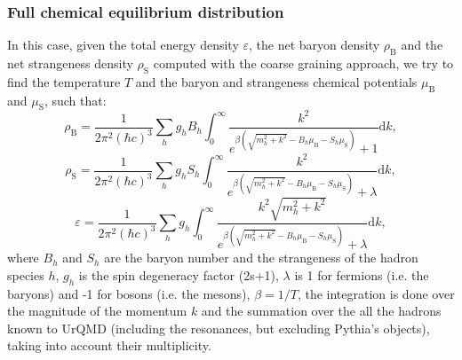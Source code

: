 \documentclass[12pt, a4paper]{article}
\newcommand{\dd}{\mathrm{d}}
\begin{document}
\subsubsection{Full chemical equilibrium distribution}\label{sec:fce}
In this case, given the total energy density $\varepsilon$, the net baryon density $\rho_{\mathrm{B}}$ and the net strangeness density $\rho_{\mathrm{S}}$ computed with the coarse graining approach, we try to find the temperature $T$ and the baryon and strangeness chemical potentials $\mu_{\mathrm{B}}$ and  $\mu_{\mathrm{S}}$, such that:
\begin{equation}
\rho_{\mathrm{B}}=\dfrac{1}{2\pi^2 (\hbar c)^3}\sum_{h}g_{h} B_{h} \int_0^\infty \dfrac{k^2}{e^{\beta{(\sqrt{m_{h}^2+k^2}-B_{h}\mu_{\mathrm{B}}-S_{h}\mu_{\mathrm{S}})}}+1}
\dd k, \label{eq:fce_rhoB}
\end{equation}
\begin{equation}
\rho_{\mathrm{S}}=\dfrac{1}{2\pi^2 (\hbar c)^3}\sum_{h}g_{h} S_{h} \int_0^\infty \dfrac{k^2}{e^{\beta{(\sqrt{m_{h}^2+k^2}-B_{h}\mu_{\mathrm{B}}-S_{h}\mu_{\mathrm{S}})}}+\lambda}
\dd k, \label{eq:fce_rhoS}
\end{equation}
\begin{equation}
\varepsilon=\dfrac{1}{2\pi^2 (\hbar c)^3}\sum_{h}g_{h}\int_0^\infty \dfrac{k^2\sqrt{m_{h}^2+k^2}}{e^{\beta{(\sqrt{m_{h}^2+k^2}-B_{h}\mu_{\mathrm{B}}-S_{h}\mu_{\mathrm{S}})}}+\lambda}
\dd k, \label{eq:fce_en}
\end{equation}
where $B_{h}$ and $S_{h}$ are the baryon number and the strangeness of the hadron species ${h}$, $g_{h}$ is the spin degeneracy factor (2s+1), $\lambda$ is 1 for fermions (i.e. the baryons) and -1 for bosons (i.e. the mesons), $\beta=1/T$, the integration is done over the magnitude of the momentum $k$ and the summation over the all the hadrons known to UrQMD (including the resonances, but excluding Pythia's objects), taking into account their multiplicity.
\end{document}
